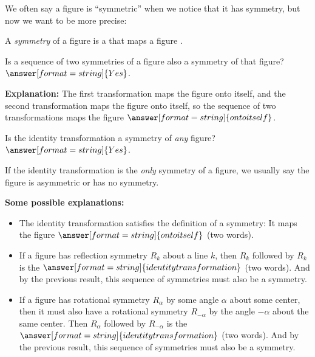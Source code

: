\documentclass[nooutcomes]{ximera}
\begin{document}
\begin{question}
We often say a figure is ``symmetric'' when we notice that it has symmetry, but now we want to be more precise:  

A \emph{symmetry} of a figure is a
that maps a figure 
.  
\end{question}

\begin{question}
Is a sequence of two symmetries of a figure also a symmetry of that figure?
$\answer[format=string]{Yes}$.
\begin{question}
\textbf{Explanation:} The first transformation maps the figure onto itself, and the second transformation maps the figure onto itself, so the sequence of two transformations maps the figure $\answer[format=string]{onto itself}$.  
\end{question}
\end{question}

\begin{question}
Is the identity transformation a symmetry of \emph{any} figure? 
$\answer[format=string]{Yes}$.
\begin{feedback}[correct]
If the identity transformation is the \emph{only} symmetry of a figure, we usually say the figure is asymmetric or has no symmetry.  
\end{feedback}
\begin{question}
\textbf{Some possible explanations:} 
\begin{itemize}
\item The identity transformation satisfies the definition of a symmetry: It maps the figure $\answer[format=string]{onto itself}$ (two words). 
\item If a figure has reflection symmetry $R_k$ about a line $k$, then $R_k$ followed by $R_k$ is the $\answer[format=string]{identity transformation}$ (two words).  And by the previous result, this sequence of symmetries must also be a symmetry.  
\item If a figure has rotational symmetry $R_\alpha$ by some angle $\alpha$ about some center, then it must also have a rotational symmetry $R_{-\alpha}$ by the angle $-\alpha$ about the same center.  Then $R_\alpha$ followed by $R_{-\alpha}$ is the $\answer[format=string]{identity transformation}$ (two words).  And by the previous result, this sequence of symmetries must also be a symmetry.  
\end{itemize}
\end{question}
\end{question}
\end{document}
